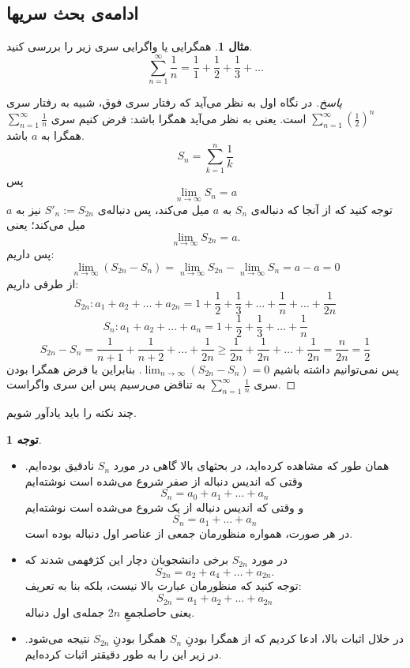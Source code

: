 \documentclass[12pt,a4paper]{article}
\theoremstyle{definition}
\newtheorem{mesal}[thm]{مثال}
\newtheorem{tav}[thm]{توجه}
\begin{document}
\subsection*{ادامه‌ی بحث سریها}
\begin{mesal}
همگرایی یا واگرایی سری زیر را بررسی کنید.
\[
\sum_{n=1}^{\infty} \frac{1}{n}=\frac{1}{1}+\frac{1}{2}+\frac{1}{3}+...
\]
\end{mesal}
\begin{proof}[پاسخ]
در نگاه اول به نظر می‌آید که رفتار سری فوق، شبیه‌ به رفتار سری
$\sum_{n=1}^\infty (\frac{1}{2})^n$
است. یعنی به نظر می‌آید همگرا باشد:
فرض کنیم سری 
$\sum_{n=1}^{\infty} \frac{1}{n}$
همگرا به 
$a$
باشد.
\[
S_n = \sum_{k=1}^{n} \frac{1}{k}
\]
پس
\[
\lim_{n \to \infty}S_n = a 
\]
توجه کنید که از آنجا که
دنباله‌ی
$S_n$
به
$a$
میل می‌کند، پس دنباله‌ی
$S'_n:=S_{2n}$
نیز به
$a$
میل می‌کند؛ یعنی
\[
\lim_{n\to \infty}S_{2n}=a.
\]
پس داریم:
\[
\lim_{n \to \infty}(S_{2n}-S_n) = \lim_{n \to \infty}S_{2n}-\lim_{n \to \infty}S_n=a-a=0
\]
از طرفی داریم:
\[
S_{2n}:a_1+a_2+\ldots+a_{2n}=1+\frac{1}{2}+\frac{1}{3}+\ldots+\frac{1}{n}+\ldots+\frac{1}{2n}
\]
\[
S_{n}:a_1+a_2+\ldots+a_{n}=1+\frac{1}{2}+\frac{1}{3}+\ldots+\frac{1}{n}
\]
\[
S_{2n}-S_n
=\frac{1}{n+1}+\frac{1}{n+2}+\ldots+\frac{1}{2n}
 \geqslant \frac{1}{2n}+\frac{1}{2n}+\ldots+\frac{1}{2n}=\frac{n}{2n}=\frac{1}{2}
\]
پس نمی‌توانیم داشته باشیم
$\lim_{n \to \infty}(S_{2n}-S_n) =0$.
بنابراین با فرض همگرا بودن سری 
$\sum_{n=1}^{\infty}\frac{1}{n}$
به تناقض می‌رسیم پس این سری واگراست.
\end{proof}
چند نکته را باید یادآور شویم.
\begin{tav}\hfill
\begin{itemize}
\item 
همان طور که مشاهده کرده‌اید،
در بحثهای بالا گاهی در مورد
$S_n$
نادقیق بوده‌ایم. وقتی که اندیس دنباله از صفر شروع می‌شده است نوشته‌ایم
\[
S_n=a_0+a_1+\ldots+a_n
\]
و وقتی
که اندیس دنباله از 
یک شروع می‌شده است
نوشته‌ایم
\[
S_n=a_1+\ldots+a_n
\]
در هر صورت، همواره منظورمان جمعی از عناصر اول دنباله بوده است.
\item 
در مورد 
$S_{2n}$
برخی دانشجویان دچار این کژفهمی شدند که
\[S_{2n}=a_2+a_4+\ldots +a_{2n}.\]
توجه کنید که منظورمان عبارت بالا نیست، بلکه بنا به تعریف:
\[
S_{2n}=a_1+a_2+\ldots+a_{2n}
\]
یعنی حاصلجمعِ
$2n$
جمله‌ی اول دنباله‌.
\item 
در خلال اثبات بالا، ادعا کردیم که از همگرا بودنِ
$S_n$
همگرا بودنِ
$S_{2n}$
نتیجه می‌شود. در زیر این را به طور دقیقتر اثبات کرده‌ایم.
\end{itemize}
\end{tav}
\end{document}
